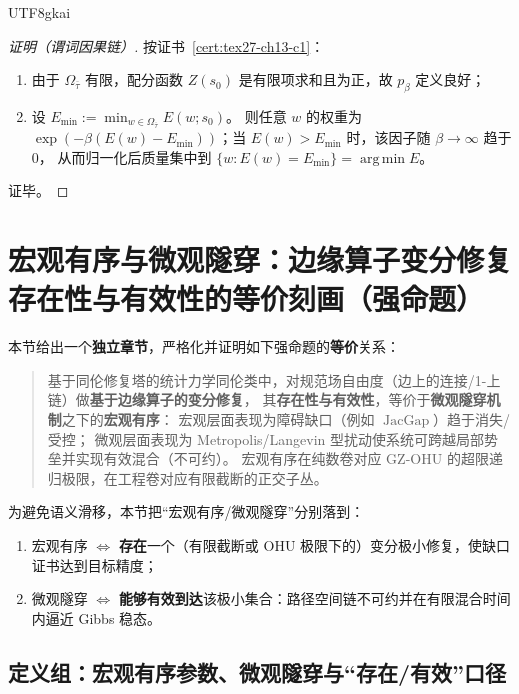 \documentclass[12pt]{article}
\newcommand{\JacGap}{\operatorname{JacGap}}
\begin{document}
\begin{CJK*}{UTF8}{gkai}
\begin{proof}[证明（谓词因果链）]
按证书~\ref{cert:tex27-ch13-c1}：
\begin{enumerate}
  \item 由于 $\Omega_{\overline{\tau}}$ 有限，配分函数 $Z(s_0)$ 是有限项求和且为正，故 $p_\beta$ 定义良好；
  \item 设 $E_{\min}:=\min_{w\in\Omega_{\overline{\tau}}}E(w;s_0)$。
  则任意 $w$ 的权重为 $\exp(-\beta(E(w)-E_{\min}))$；当 $E(w)>E_{\min}$ 时，该因子随 $\beta\to\infty$ 趋于 $0$，
  从而归一化后质量集中到 $\{w:E(w)=E_{\min}\}=\operatorname*{arg\,min}E$。
\end{enumerate}
证毕。
\end{proof}

\section{宏观有序与微观隧穿：边缘算子变分修复存在性与有效性的等价刻画（强命题）}
\label{sec:tex27-ch14-order-tunneling-equivalence}

本节给出一个\textbf{独立章节}，严格化并证明如下强命题的\textbf{等价}关系：
\begin{quote}
  基于同伦修复塔的统计力学同伦类中，对规范场自由度（边上的连接/1-上链）做\textbf{基于边缘算子的变分修复}，
  其\textbf{存在性与有效性}，等价于\textbf{微观隧穿机制}之下的\textbf{宏观有序}：
  宏观层面表现为障碍缺口（例如 $\JacGap$）趋于消失/受控；
  微观层面表现为 Metropolis/Langevin 型扰动使系统可跨越局部势垒并实现有效混合（不可约）。
  宏观有序在纯数卷对应 GZ-OHU 的超限递归极限，在工程卷对应有限截断的正交子丛。
\end{quote}

为避免语义滑移，本节把“宏观有序/微观隧穿”分别落到：
\begin{enumerate}
  \item 宏观有序 $\Longleftrightarrow$ \textbf{存在}一个（有限截断或 OHU 极限下的）变分极小修复，使缺口证书达到目标精度；
  \item 微观隧穿 $\Longleftrightarrow$ \textbf{能够有效到达}该极小集合：路径空间链不可约并在有限混合时间内逼近 Gibbs 稳态。
\end{enumerate}

\subsection{定义组：宏观有序参数、微观隧穿与“存在/有效”口径}
\label{subsec:tex27-ch14-defs}


\end{CJK*}
\end{document}
